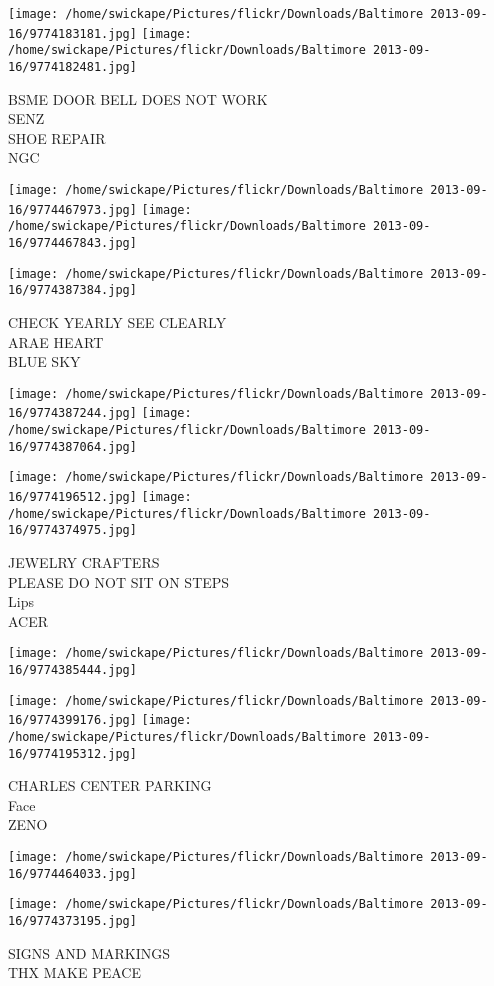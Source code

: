 \documentclass[10pt,letterpaper]{article}
\begin{document}
\texttt{[image: /home/swickape/Pictures/flickr/Downloads/Baltimore 2013-09-16/9774183181.jpg]}
\texttt{[image: /home/swickape/Pictures/flickr/Downloads/Baltimore 2013-09-16/9774182481.jpg]}

BSME DOOR BELL DOES NOT WORK\\
SENZ\\
SHOE REPAIR\\
NGC
\pagebreak

\texttt{[image: /home/swickape/Pictures/flickr/Downloads/Baltimore 2013-09-16/9774467973.jpg]}
\texttt{[image: /home/swickape/Pictures/flickr/Downloads/Baltimore 2013-09-16/9774467843.jpg]}

\vspace{0.25in}
\texttt{[image: /home/swickape/Pictures/flickr/Downloads/Baltimore 2013-09-16/9774387384.jpg]}

CHECK YEARLY SEE CLEARLY\\
ARAE HEART\\
BLUE SKY
\pagebreak

\texttt{[image: /home/swickape/Pictures/flickr/Downloads/Baltimore 2013-09-16/9774387244.jpg]}
\texttt{[image: /home/swickape/Pictures/flickr/Downloads/Baltimore 2013-09-16/9774387064.jpg]}

\texttt{[image: /home/swickape/Pictures/flickr/Downloads/Baltimore 2013-09-16/9774196512.jpg]}
\texttt{[image: /home/swickape/Pictures/flickr/Downloads/Baltimore 2013-09-16/9774374975.jpg]}

JEWELRY CRAFTERS\\
PLEASE DO NOT SIT ON STEPS\\
Lips\\
ACER
\pagebreak

\texttt{[image: /home/swickape/Pictures/flickr/Downloads/Baltimore 2013-09-16/9774385444.jpg]}

\vspace{0.25in}
\texttt{[image: /home/swickape/Pictures/flickr/Downloads/Baltimore 2013-09-16/9774399176.jpg]}
\texttt{[image: /home/swickape/Pictures/flickr/Downloads/Baltimore 2013-09-16/9774195312.jpg]}

CHARLES CENTER PARKING\\
Face\\
ZENO
\pagebreak

\texttt{[image: /home/swickape/Pictures/flickr/Downloads/Baltimore 2013-09-16/9774464033.jpg]}

\vspace{0.25in}
\texttt{[image: /home/swickape/Pictures/flickr/Downloads/Baltimore 2013-09-16/9774373195.jpg]}

SIGNS AND MARKINGS\\
THX MAKE PEACE
\pagebreak
\end{document}
